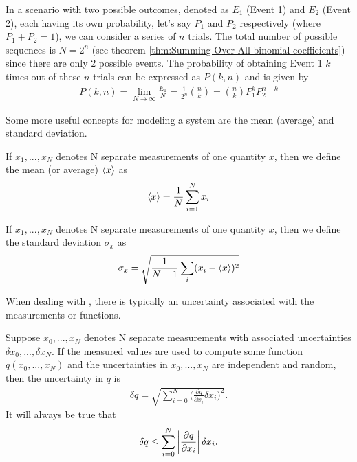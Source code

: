 In a scenario with two possible outcomes, denoted as $E_1$ (Event 1) and $E_2$ (Event 2), each having its own probability, let's say $P_1$ and $P_2$ respectively (where $P_1 + P_2 = 1$), we can consider a series of $n$ trials. The total number of possible sequences is $N=2^n$ (see theorem \ref{thm:Summing Over All binomial coefficients}) since there are only 2 possible events. The probability of obtaining Event 1 $k$ times out of these $n$ trials can be expressed as $P(k, n)$ and is given by
\begin{align}
P(k,n) = \lim_{N\rightarrow\infty}\frac{E_1}{N} = \frac{1}{2^n}{{n}\choose{k}} = {{n}\choose{k}}P_1^kP_2^{n-k}
\end{align}

Some more useful concepts for modeling a system are the mean (average) and standard deviation. 

\begin{defn}
	If $x_1, ..., x_N$ denotes N separate measurements of one quantity $x$, then we define the mean (or average) $\braket{x}$ as
	\begin{align}
		\braket{x} = \frac{1}{N}\sum_{i=1}^{N}x_i \label{mean equation}
	\end{align}
\end{defn}

\begin{defn}
	If $x_1, ..., x_N$ denotes N separate measurements of one quantity $x$, then we define the standard deviation $\sigma_x$ as
	\begin{align}
		\sigma_x = \sqrt{\frac{1}{N-1}\sum_{i}(x_i-\braket{x})^2}
	\end{align}
\end{defn}

When dealing with , there is typically an uncertainty associated with the measurements or functions.

\begin{defn}
	Suppose $x_0, ..., x_N$ denotes N separate measurements with associated uncertainties $\delta x_0, ..., \delta x_N$. If the measured values are used to compute some function $q(x_0, ..., x_N)$ and the uncertainties in $x_0, ..., x_N$ are independent and random, then the uncertainty in $q$ is
	\begin{align}
		\delta q = \sqrt{\sum_{i=0}^{N}\bigg(\frac{\partial q}{\partial x_i} \delta x_i\bigg)^2}.
	\end{align}
 It will always be true that 
 	\begin{align}
		\delta q \leq \sum_{i=0}^{N}\left| \frac{\partial q}{\partial x_i} \right| \delta x_i.
	\end{align}
\end{defn}
